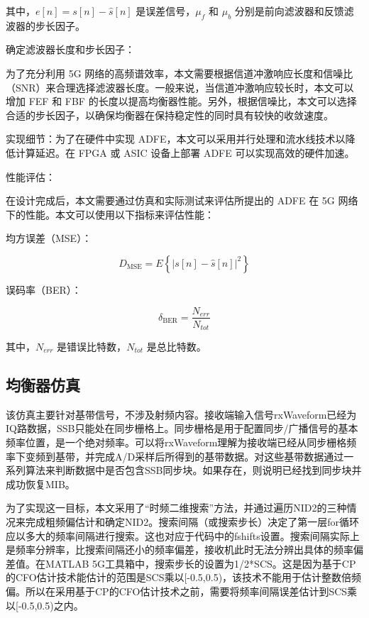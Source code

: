 \documentclass[UTF8,a4paper,12pt]{ctexart}
\numberwithin{equation}{section}
\begin{document}
	其中，$e[n] = s[n] - \hat{s}[n]$ 是误差信号，$\mu_f$ 和 $\mu_b$ 分别是前向滤波器和反馈滤波器的步长因子。
	
	确定滤波器长度和步长因子：
	
	为了充分利用 5G 网络的高频谱效率，本文需要根据信道冲激响应长度和信噪比（SNR）来合理选择滤波器长度。一般来说，当信道冲激响应较长时，本文可以增加 FEF 和 FBF 的长度以提高均衡器性能。另外，根据信噪比，本文可以选择合适的步长因子，以确保均衡器在保持稳定性的同时具有较快的收敛速度。
	
	实现细节：为了在硬件中实现 ADFE，本文可以采用并行处理和流水线技术以降低计算延迟。在 FPGA 或 ASIC 设备上部署 ADFE 可以实现高效的硬件加速。
	
	性能评估：
	
	在设计完成后，本文需要通过仿真和实际测试来评估所提出的 ADFE 在 5G 网络下的性能。本文可以使用以下指标来评估性能：
	
	均方误差（MSE）：
	
	\begin{equation}
		D_\text{MSE} = E\left\{ |s[n] - \hat{s}[n]|^2 \right\}
	\end{equation}
	
	误码率（BER）：
	
	\begin{equation}
		\delta_\text{BER} = \frac{N_{err}}{N_{tot}}
	\end{equation}
	
	其中，$N_{err}$ 是错误比特数，$N_{tot}$ 是总比特数。
	
	\subsection{均衡器仿真}
	该仿真主要针对基带信号，不涉及射频内容。接收端输入信号rxWaveform已经为IQ路数据，SSB只能处在同步栅格上。同步栅格是用于配置同步/广播信号的基本频率位置，是一个绝对频率。可以将rxWaveform理解为接收端已经从同步栅格频率下变频到基带，并完成A/D采样后所得到的基带数据。对这些基带数据通过一系列算法来判断数据中是否包含SSB同步块。如果存在，则说明已经找到同步块并成功恢复MIB。
	
	为了实现这一目标，本文采用了“时频二维搜索”方法，并通过遍历NID2的三种情况来完成粗频偏估计和确定NID2。搜索间隔（或搜索步长）决定了第一层for循环应以多大的频率间隔进行搜索。这也对应于代码中的fshifts设置。搜索间隔实际上是频率分辨率，比搜索间隔还小的频率偏差，接收机此时无法分辨出具体的频率偏差值。在MATLAB 5G工具箱中，搜索步长的设置为1/2*SCS。这是因为基于CP的CFO估计技术能估计的范围是SCS乘以[-0.5,0.5)，该技术不能用于估计整数倍频偏。所以在采用基于CP的CFO估计技术之前，需要将频率间隔误差估计到SCS乘以[-0.5,0.5)之内。
	
\end{document}
